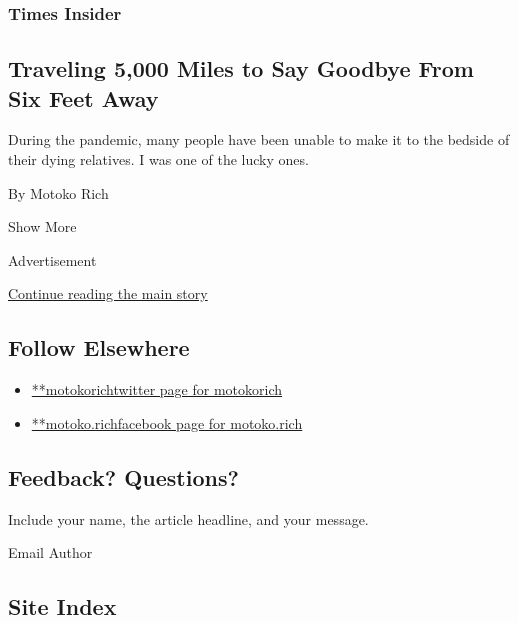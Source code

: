 \begin{enumerate}
  \hypertarget{times-insider-1}{%
  \subsubsection{Times Insider}\label{times-insider-1}}

  \hypertarget{traveling-5000-miles-to-say-goodbye-from-six-feet-away}{%
  \subsection{Traveling 5,000 Miles to Say Goodbye From Six Feet
  Away}\label{traveling-5000-miles-to-say-goodbye-from-six-feet-away}}

  During the pandemic, many people have been unable to make it to the
  bedside of their dying relatives. I was one of the lucky ones.

  By Motoko Rich
\end{enumerate}

Show More

Advertisement

\protect\hyperlink{after-mid2}{Continue reading the main story}

\hypertarget{follow-elsewhere}{%
\subsection{Follow Elsewhere}\label{follow-elsewhere}}

\begin{itemize}
\tightlist
\item
  \href{https://twitter.com/motokorich}{**motokorichtwitter page for
  motokorich}
\item
  \href{https://www.facebook.com/motoko.rich}{**motoko.richfacebook page
  for motoko.rich}
\end{itemize}

\hypertarget{feedback-questions}{%
\subsection{Feedback? Questions?}\label{feedback-questions}}

Include your name, the article headline, and your message.

Email Author

\hypertarget{site-index}{%
\subsection{Site Index}\label{site-index}}


